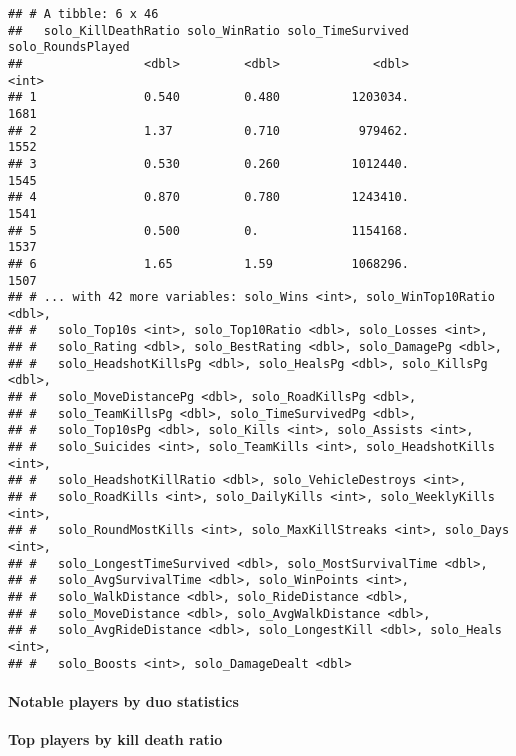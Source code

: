 \documentclass[]{article}
\let\oldparagraph\paragraph
\renewcommand{\paragraph}[1]{\oldparagraph{#1}\mbox{}}
\begin{document}
\begin{verbatim}
## # A tibble: 6 x 46
##   solo_KillDeathRatio solo_WinRatio solo_TimeSurvived solo_RoundsPlayed
##                 <dbl>         <dbl>             <dbl>             <int>
## 1               0.540         0.480          1203034.              1681
## 2               1.37          0.710           979462.              1552
## 3               0.530         0.260          1012440.              1545
## 4               0.870         0.780          1243410.              1541
## 5               0.500         0.             1154168.              1537
## 6               1.65          1.59           1068296.              1507
## # ... with 42 more variables: solo_Wins <int>, solo_WinTop10Ratio <dbl>,
## #   solo_Top10s <int>, solo_Top10Ratio <dbl>, solo_Losses <int>,
## #   solo_Rating <dbl>, solo_BestRating <dbl>, solo_DamagePg <dbl>,
## #   solo_HeadshotKillsPg <dbl>, solo_HealsPg <dbl>, solo_KillsPg <dbl>,
## #   solo_MoveDistancePg <dbl>, solo_RoadKillsPg <dbl>,
## #   solo_TeamKillsPg <dbl>, solo_TimeSurvivedPg <dbl>,
## #   solo_Top10sPg <dbl>, solo_Kills <int>, solo_Assists <int>,
## #   solo_Suicides <int>, solo_TeamKills <int>, solo_HeadshotKills <int>,
## #   solo_HeadshotKillRatio <dbl>, solo_VehicleDestroys <int>,
## #   solo_RoadKills <int>, solo_DailyKills <int>, solo_WeeklyKills <int>,
## #   solo_RoundMostKills <int>, solo_MaxKillStreaks <int>, solo_Days <int>,
## #   solo_LongestTimeSurvived <dbl>, solo_MostSurvivalTime <dbl>,
## #   solo_AvgSurvivalTime <dbl>, solo_WinPoints <int>,
## #   solo_WalkDistance <dbl>, solo_RideDistance <dbl>,
## #   solo_MoveDistance <dbl>, solo_AvgWalkDistance <dbl>,
## #   solo_AvgRideDistance <dbl>, solo_LongestKill <dbl>, solo_Heals <int>,
## #   solo_Boosts <int>, solo_DamageDealt <dbl>
\end{verbatim}

\paragraph{Notable players by duo
statistics}\label{notable-players-by-duo-statistics}

\textbf{Top players by kill death ratio}
\end{document}
